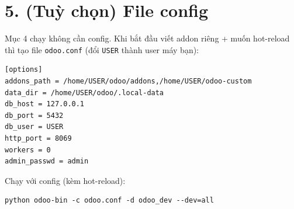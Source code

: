 \documentclass[11pt,a4paper]{article}
\begin{document}
\section*{5. (Tuỳ chọn) File config}
Mục 4 chạy không cần config. Khi bắt đầu viết addon riêng + muốn hot-reload thì tạo
file \texttt{odoo.conf} (đổi \texttt{USER} thành user máy bạn):

\begin{lstlisting}
[options]
addons_path = /home/USER/odoo/addons,/home/USER/odoo-custom
data_dir = /home/USER/odoo/.local-data
db_host = 127.0.0.1
db_port = 5432
db_user = USER
http_port = 8069
workers = 0
admin_passwd = admin
\end{lstlisting}

Chạy với config (kèm hot-reload):
\begin{lstlisting}
python odoo-bin -c odoo.conf -d odoo_dev --dev=all
\end{lstlisting}
\end{document}

